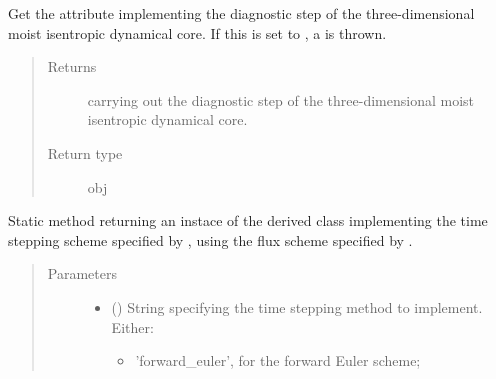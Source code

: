 \documentclass[letterpaper,10pt,english]{sphinxmanual}
\begin{document}
\begin{fulllineitems}
\begin{fulllineitems}
\label{\detokenize{api:tasmania.dycore.prognostic_isentropic.PrognosticIsentropic.diagnostic}}
Get the attribute implementing the diagnostic step of the three-dimensional moist isentropic dynamical core.
If this is set to , a  is thrown.
\begin{quote}\begin{description}
\item[{Returns}] \leavevmode
{\hyperref[\detokenize{api:tasmania.dycore.diagnostic_isentropic.DiagnosticIsentropic}]{}} carrying out the diagnostic step of the
three-dimensional moist isentropic dynamical core.

\item[{Return type}] \leavevmode
obj

\end{description}\end{quote}

\end{fulllineitems}


\begin{fulllineitems}
\label{\detokenize{api:tasmania.dycore.prognostic_isentropic.PrognosticIsentropic.factory}}
Static method returning an instace of the derived class implementing the time stepping scheme specified
by , using the flux scheme specified by .
\begin{quote}\begin{description}
\item[{Parameters}] \leavevmode\begin{itemize}
\item {} 
 () \textendash{} 
String specifying the time stepping method to implement. Either:
\begin{itemize}
\item {} 
’forward\_euler’, for the forward Euler scheme;


\end{itemize}
\end{itemize}
\end{description}
\end{quote}
\end{fulllineitems}
\end{fulllineitems}
\end{document}
